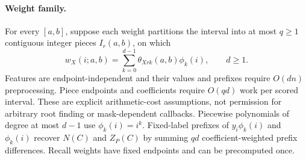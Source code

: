 \paragraph{Weight family.}
For every $[a,b]$, suppose each weight partitions the interval into at most
$q\geq1$ contiguous integer pieces $I_r(a,b)$, on which
\[
 w_X(i;a,b)=\sum_{k=0}^{d-1}\theta_{Xrk}(a,b)\phi_k(i),\qquad d\geq1.
\]
Features are endpoint-independent and their values and prefixes require
$O(dn)$ preprocessing. Piece endpoints and coefficients require $O(qd)$
work per scored interval. These are explicit arithmetic-cost assumptions,
not permission for arbitrary root finding or mask-dependent callbacks.
Piecewise polynomials of degree at most $d-1$ use $\phi_k(i)=i^k$.
Fixed-label prefixes of $y_i\phi_k(i)$ and $\phi_k(i)$ recover $N(C)$ and
$Z_P(C)$ by summing $qd$ coefficient-weighted prefix differences. Recall
weights have fixed endpoints and can be precomputed once.

